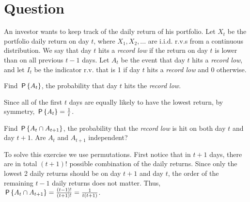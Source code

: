 \section*{Question}

An investor wants to keep track of the daily return of his portfolio.  Let $X_t$ be the portfolio daily return on day $t$, where $X_1, X_2, . . . $ are i.i.d. r.v.s from a continuous distribution. We say that day $t$ hits a \textit{record low} if the return on day $t$ is lower than on all previous $t-1$ days. Let $A_t$ be the event that day $t$ hits a \textit{record low}, and let $I_{t}$ be the indicator r.v. that is 1 if day $t$ hits a \textit{record low} and 0 otherwise.

\begin{exercise}[0.5]
 Find $\P{A_t}$, the probability that day $t$ hits the \textit{record low}.
\begin{solution}
Since all of the first $t$ days are equally likely to have the lowest return, by symmetry, $\P{A_t}=\frac{1}{t}$.
\end{solution}
\end{exercise}

\begin{exercise}[1]
Find $\P{A_t \cap A_{t+1}}$, the probability that the \textit{record low} is hit on both day $t$ and day $t+1$. Are $A_t$ and $A_{t+1}$ independent? 
\begin{solution}
To solve this exercise we use permutations. First notice that in $t+1$ days, there are in total $(t+1)!$ possible combination of the  daily returns. Since only the lowest 2 daily returns should be on day $t+1$ and day $t$, the order of the remaining $t-1$ daily returns does not matter. Thus, $ \P{A_t \cap A_{t+1}}=\frac{(t-1)!}{(t+1)!}=\frac{1}{t(t+1)}$.

\end{solution}
\end{exercise}

